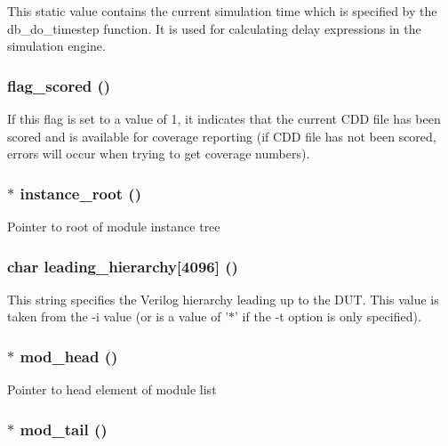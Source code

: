 This static value contains the current simulation time which is specified by the db\_\-do\_\-timestep function. It is used for calculating delay expressions in the simulation engine. 
\subsubsection{ {\bf flag\_\-scored} ()}\label{db_8c_a9}


If this flag is set to a value of 1, it indicates that the current CDD file has been scored and is available for coverage reporting (if CDD file has not been scored, errors will occur when trying to get coverage numbers). 
\subsubsection{$\ast$ {\bf instance\_\-root} ()}\label{db_8c_a1}


Pointer to root of module instance tree 
\subsubsection{\setlength{\rightskip}{0pt plus 5cm}char {\bf leading\_\-hierarchy}[4096] ()}\label{db_8c_a8}


This string specifies the Verilog hierarchy leading up to the DUT. This value is taken from the -i value (or is a value of '$\ast$' if the -t option is only specified). 
\subsubsection{$\ast$ {\bf mod\_\-head} ()}\label{db_8c_a3}


Pointer to head element of module list 
\subsubsection{$\ast$ {\bf mod\_\-tail} ()}\label{db_8c_a4}


